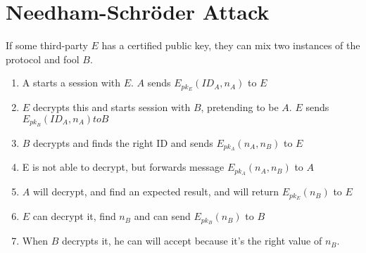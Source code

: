 \documentclass[14pt]{beamer}
\begin{document}
    \section{Needham-Schröder Attack}
                \begin{frame}
                    If some third-party $E$ has a certified public key, they can mix two instances of the protocol and fool $B$.  

                    \begin{enumerate}
                        \item A starts a session with $E$. $A$ sends $E_{pk_E}(ID_A, n_A)$ to $E$
                        \item $E$ decrypts this and starts session with $B$, pretending to be $A$. $E$ sends $E_{pk_B}(ID_A, n_A) to B$
                        \item $B$ decrypts and finds the right ID and sends $E_{pk_A}(n_A, n_B)$ to $E$
                        \item E is not able to decrypt, but forwards message $E_{pk_A}(n_A, n_B)$ to $A$
                        \item $A$ will decrypt, and find an expected result, and will return $E_{pk_E}(n_B)$ to $E$
                        \item $E$ can decrypt it, find $n_B$ and can send $E_{pk_B}(n_B)$ to $B$
                        \item When $B$ decrypts it, he can will accept because it's  the right value of $n_B$. 
                    \end{enumerate}
                \end{frame}
\end{document}

